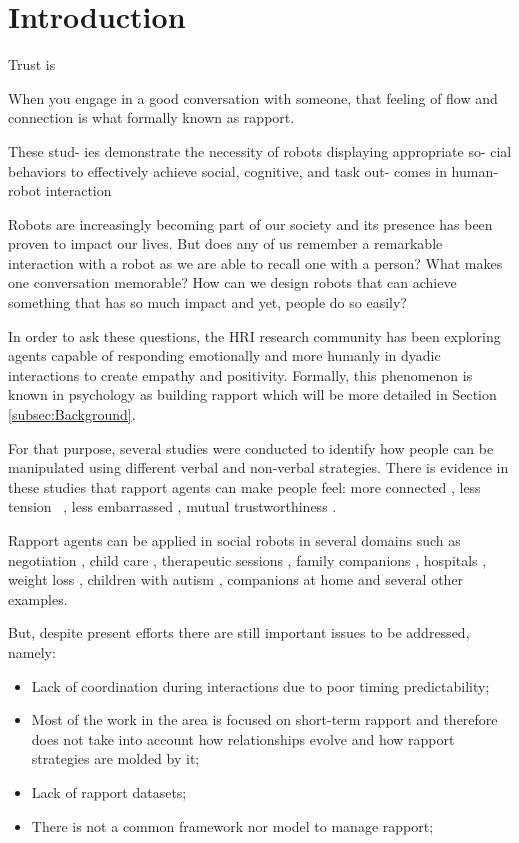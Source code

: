 \section{Introduction}
\label{sec:Introduction}
Trust is 



When you engage in a good conversation with someone, that feeling of flow and connection is what formally known as rapport.

These stud- ies demonstrate the necessity of robots displaying appropriate so- cial behaviors to effectively achieve social, cognitive, and task out- comes in human-robot interaction
%

Robots are increasingly becoming part of our society and its presence has been proven to impact our lives. But does any of us remember a remarkable interaction with a robot as we are able to recall one with a person? What makes one conversation memorable? How can we design robots that can achieve something that has so much impact and yet, people do so easily?

In order to ask these questions, the \ac{HRI} research community has been exploring agents capable of responding emotionally and more humanly in dyadic interactions to create empathy and positivity. Formally, this phenomenon is known in psychology as building rapport which will be more detailed in Section \ref{subsec:Background}. 

For that purpose, several studies were conducted to identify how people can be manipulated using different verbal and non-verbal strategies. There is evidence in these studies that rapport agents can make people feel: more connected \cite{Rosenthal-vonderPutten2013}, less tension ~\cite{Wang2010}, less embarrassed \cite{Kang2009}, mutual trustworthiness \cite{Kang2009}. 

Rapport agents can be applied in social robots in several domains such as negotiation \cite{Nadler2003}, child care \cite{Burns1984}, therapeutic sessions \cite{Lisetti2013}, family companions \cite{Andrist2014, Bickmore2005}, hospitals \cite{Bull1981} \cite{Kang2005}, weight loss \cite{Burroughs2007}, children with autism \cite{Feil-Seifer2009, Scassellati2012}, companions at home \cite{Fasola2012, Marti2006} and several other examples.

But, despite present efforts there are still important issues to be addressed, namely:
\begin{itemize}
	\item Lack of coordination during interactions due to poor timing predictability;
	\item Most of the work in the area is focused on short-term rapport and therefore does not take into account how relationships evolve and how rapport strategies are molded by it;
	\item Lack of rapport datasets;
	\item There is not a common framework nor model to manage rapport;
\end{itemize}


